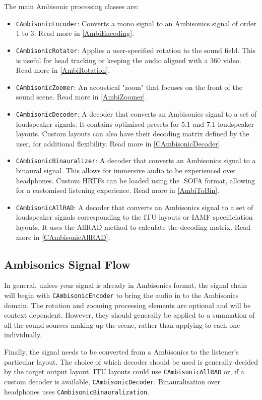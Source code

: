 \documentclass[12pt]{report}
\newcommand{\code}[1]{\texttt{#1}}
\begin{document}
The main Ambisonic processing classes are:
\begin{itemize}
\item \code{CAmbisonicEncoder}: Converts a mono signal to an Ambisonics signal of order 1 to 3. Read more in \cref{AmbiEncoding}.
\item \code{CAmbisonicRotator}: Applies a user-specified rotation to the sound field. This is useful for head tracking or keeping the audio aligned with a 360 video. Read more in \cref{AmbiRotation}.
\item \code{CAmbisonicZoomer}: An acoustical "zoom" that focuses on the front of the sound scene. Read more in \cref{AmbiZoomer}.
\item \code{CAmbisonicDecoder}: A decoder that converts an Ambisonics signal to a set of loudspeaker signals. It contains optimised presets for 5.1 and 7.1 loudspeaker layouts. Custom layouts can also have their decoding matrix defined by the user, for additional flexibility. Read more in \cref{CAmbisonicDecoder}.
\item \code{CAmbisonicBinauralizer}: A decoder that converts an Ambisonics signal to a binaural signal. This allows for immersive audio to be experienced over headphones. Custom HRTFs can be loaded using the .SOFA format, allowing for a customised listening experience. Read more in \cref{AmbiToBin}.
\item \code{CAmbisonicAllRAD}: A decoder that converts an Ambisonics signal to a set of loudspeaker signals corresponding to the ITU layouts or IAMF specificiation layouts. It uses the AllRAD method to calculate the decoding matrix. Read more in \cref{CAmbisonicAllRAD}.
\end{itemize}

\subsection{Ambisonics Signal Flow}

In general, unless your signal is already in Ambisonics format, the signal chain will begin with \code{CAmbisonicEncoder} to bring the audio in to the Ambisonics domain.
The rotation and zooming processing elements are optional and will be context dependent. However, they should generally be applied to a summation of all the sound sources making up the scene, rather than applying to each one individually.

Finally, the signal needs to be converted from a Ambisonics to the listener's particular layout. The choice of which decoder should be used is generally decided by the target output layout. ITU layouts could use \code{CAmbisonicAllRAD} or, if a custom decoder is available, \code{CAmbisonicDecoder}. Binauralisation over headphones uses \code{CAmbisonicBinauralization}.
\end{document}
